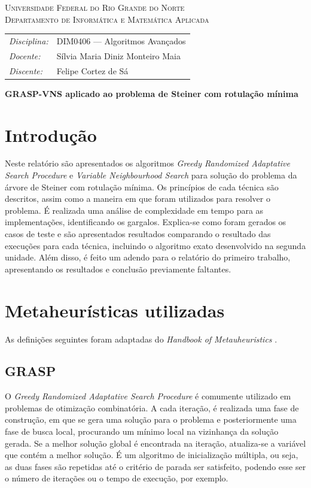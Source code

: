 \documentclass[12pt, a4paper]{article}
\begin{document}
\begin{center}
    \textsc{Universidade Federal do Rio Grande do Norte} \\
    \textsc{Departamento de Informática e Matemática Aplicada}
\end{center}

\bigskip

\begin{tabular}{@{}ll@{}}
    \emph{Disciplina:} & DIM0406 --- Algoritmos Avançados \\
    \emph{Docente:}    & Sílvia Maria Diniz Monteiro Maia \\
    \emph{Discente:}   & Felipe Cortez de Sá \\
\end{tabular}

\bigskip

\begin{center}
\large \textbf{GRASP-VNS aplicado ao problema de Steiner com rotulação mínima}
\end{center}

\section{Introdução}
Neste relatório são apresentados os algoritmos \emph{Greedy Randomized
Adaptative Search Procedure} e \emph{Variable Neighbourhood Search} para
solução do problema da árvore de Steiner com rotulação mínima. Os princípios de
cada técnica são descritos, assim como a maneira em que foram utilizados para
resolver o problema. É realizada uma análise de complexidade em tempo para as
implementações, identificando os gargalos. Explica-se como foram gerados os
casos de teste e são apresentados resultados comparando o resultado das
execuções para cada técnica, incluindo o algoritmo exato desenvolvido na
segunda unidade. Além disso, é feito um adendo para o relatório do primeiro
trabalho, apresentando os resultados e conclusão previamente faltantes.

\section{Metaheurísticas utilizadas}
As definições seguintes foram adaptadas do \emph{Handbook of Metauheuristics}
\cite{handbook}.

\subsection{GRASP}
O \emph{Greedy Randomized Adaptative Search Procedure} é comumente utilizado em
problemas de otimização combinatória. A cada iteração, é realizada uma fase de
construção, em que se gera uma solução para o problema e posteriormente uma
fase de busca local, procurando um mínimo local na vizinhança da solução
gerada. Se a melhor solução global é encontrada na iteração, atualiza-se a
variável que contém a melhor solução. É um algoritmo de inicialização múltipla,
ou seja, as duas fases são repetidas até o critério de parada ser satisfeito,
podendo esse ser o número de iterações ou o tempo de execução, por exemplo.
\end{document}
